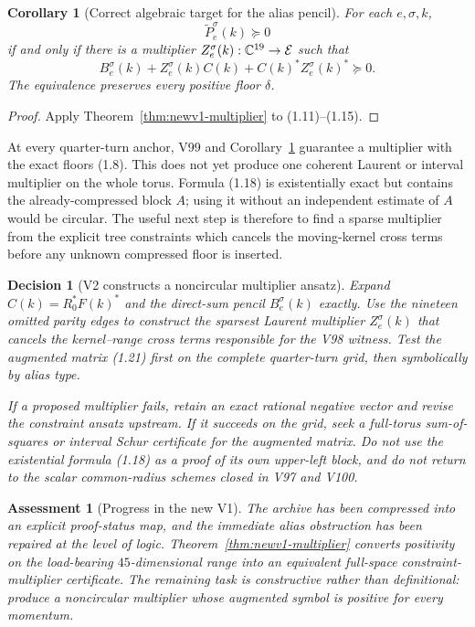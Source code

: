 \documentclass[11pt,oneside]{article}
\newtheorem{corollary}[theorem]{Corollary}
\newtheorem{assessment}[theorem]{Assessment}
\newtheorem{decision}[theorem]{Decision}
\theoremstyle{definition}
\theoremstyle{remark}
\begin{document}
\begin{corollary}[Correct algebraic target for the alias pencil]
\label{cor:newv1-alias-target}
For each \(e,\sigma,k\),
\[
 \widetilde P_e^\sigma(k)\succeq0
\]
if and only if there is a multiplier
\(Z_e^\sigma(k):\mathbb C^{19}\to{\cal E}\) such that
\[
 B_e^\sigma(k)
 +Z_e^\sigma(k)C(k)
 +C(k)^*Z_e^\sigma(k)^*\succeq0.                           \tag{1.21}
\]
The equivalence preserves every positive floor \(\delta\).
\end{corollary}

\begin{proof}
Apply Theorem~\ref{thm:newv1-multiplier} to (1.11)--(1.15).
\end{proof}

At every quarter-turn anchor, V99 and
Corollary~\ref{cor:newv1-alias-target} guarantee a multiplier with
the exact floors (1.8).  This does not yet produce one coherent
Laurent or interval multiplier on the whole torus.  Formula (1.18)
is existentially exact but contains the already-compressed block
\(A\); using it without an independent estimate of \(A\) would be
circular.  The useful next step is therefore to find a sparse
multiplier from the explicit tree constraints which cancels the
moving-kernel cross terms before any unknown compressed floor is
inserted.

\begin{decision}[V2 constructs a noncircular multiplier ansatz]
\label{dec:newv1-next}
Expand \(C(k)=R_0^*F(k)^*\) and the direct-sum pencil
\(B_e^\sigma(k)\) exactly.  Use the nineteen omitted parity edges to
construct the sparsest Laurent multiplier \(Z_e^\sigma(k)\) that
cancels the kernel--range cross terms responsible for the V98
witness.  Test the augmented matrix (1.21) first on the complete
quarter-turn grid, then symbolically by alias type.

If a proposed multiplier fails, retain an exact rational negative
vector and revise the constraint ansatz upstream.  If it succeeds on
the grid, seek a full-torus sum-of-squares or interval Schur
certificate for the augmented matrix.  Do not use the existential
formula (1.18) as a proof of its own upper-left block, and do not
return to the scalar common-radius schemes closed in V97 and V100.
\end{decision}

\begin{assessment}[Progress in the new V1]
\label{ass:newv1-progress}
The archive has been compressed into an explicit proof-status map,
and the immediate alias obstruction has been repaired at the level
of logic.  Theorem~\ref{thm:newv1-multiplier} converts positivity on
the load-bearing \(45\)-dimensional range into an equivalent
full-space constraint-multiplier certificate.  The remaining task is
constructive rather than definitional: produce a noncircular
multiplier whose augmented symbol is positive for every momentum.
\end{assessment}
\end{document}
